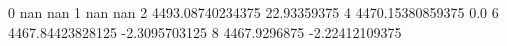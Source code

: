 0 nan nan
1 nan nan
2 4493.08740234375 22.93359375
4 4470.15380859375 0.0
6 4467.84423828125 -2.3095703125
8 4467.9296875 -2.22412109375
